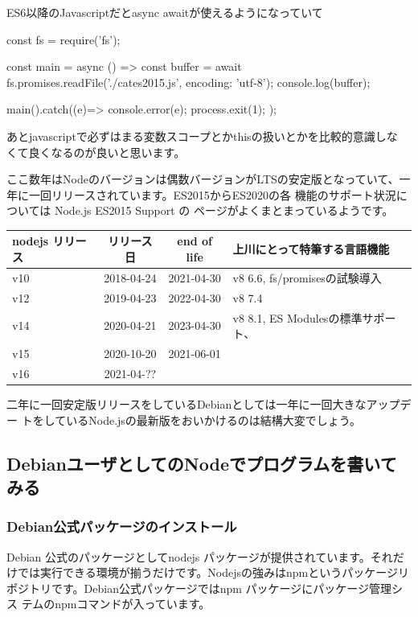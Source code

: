 \documentclass[mingoth,a4paper]{jsarticle}
\begin{document}
ES6以降のJavascriptだとasync awaitが使えるようになっていて

\begin{commandline}
const fs  = require('fs');

const main = async () => {
    const buffer = await fs.promises.readFile('./cates2015.js',
					      {encoding: 'utf-8'});
    console.log(buffer);
}

main().catch((e)=>{
    console.error(e);
    process.exit(1);
});

\end{commandline}

あとjavascriptで必ずはまる変数スコープとかthisの扱いとかを比較的意識しな
くて良くなるのが良いと思います。

ここ数年はNodeのバージョンは偶数バージョンがLTSの安定版となっていて、一
年に一回リリースされています\cite{nodejsreleases}。ES2015からES2020の各
機能のサポート状況については Node.js ES2015 Support \cite{node-green}の
ページがよくまとまっているようです。

\begin{tabular}{|l|c|c|l|}
\hline
nodejs リリース & リリース日 & end of life & 上川にとって特筆する言語機能\\
\hline
v10 & 2018-04-24 & 2021-04-30 & v8 6.6, fs/promisesの試験導入 \\
v12 & 2019-04-23 & 2022-04-30 & v8 7.4\\
v14 & 2020-04-21 & 2023-04-30 & v8 8.1, ES Modulesの標準サポート、 \\
v15 & 2020-10-20 & 2021-06-01 &  \\
v16 & 2021-04-?? &            &  \\
\hline
\end{tabular}

二年に一回安定版リリースをしているDebianとしては一年に一回大きなアップデー
トをしているNode.jsの最新版をおいかけるのは結構大変でしょう。

\subsection{DebianユーザとしてのNodeでプログラムを書いてみる}

\subsubsection{Debian公式パッケージのインストール}


Debian 公式のパッケージとしてnodejs パッケージが提供されています。それだ
けでは実行できる環境が揃うだけです。Nodejsの強みはnpmというパッケージリ
ポジトリです。Debian公式パッケージではnpm パッケージにパッケージ管理シス
テムのnpmコマンドが入っています。
\end{document}
